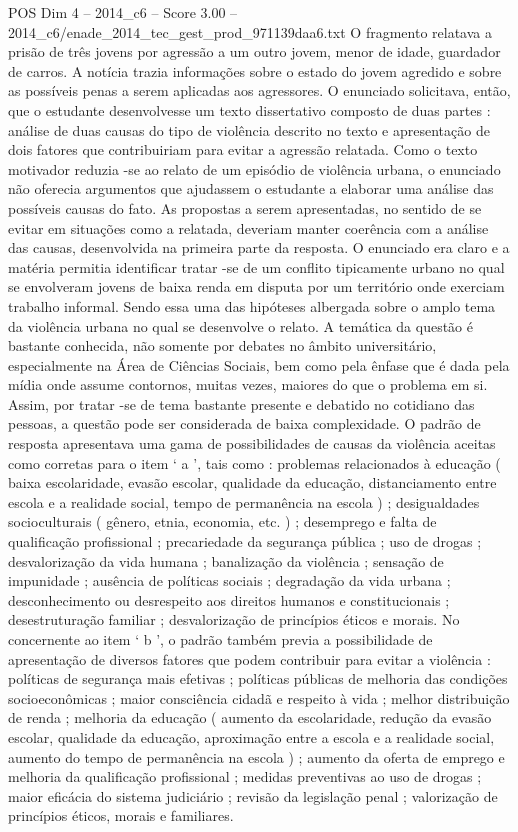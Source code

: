 \begin{textsample}{POS Dim 4 – 2014\_c6 – Score 3.00 – 2014\_c6/enade\_2014\_tec\_gest\_prod\_971139daa6.txt}
O fragmento relatava a prisão de três jovens por agressão a um outro jovem, menor de idade, guardador de carros.
A notícia trazia informações sobre o estado do jovem agredido e sobre as possíveis penas a serem aplicadas aos agressores.
O enunciado solicitava, então, que o estudante desenvolvesse um texto dissertativo composto de duas partes : análise de duas causas do tipo de violência descrito no texto e apresentação de dois fatores que contribuiriam para evitar a agressão relatada.
Como o texto motivador reduzia -se ao relato de um episódio de violência urbana, o enunciado não oferecia argumentos que ajudassem o estudante a elaborar uma análise das possíveis causas do fato.
As propostas a serem apresentadas, no sentido de se evitar em situações como a relatada, deveriam manter coerência com a análise das causas, desenvolvida na primeira parte da resposta.
O enunciado era claro e a matéria permitia identificar tratar -se de um conflito tipicamente urbano no qual se envolveram jovens de baixa renda em disputa por um território onde exerciam trabalho informal.
Sendo essa uma das hipóteses albergada sobre o amplo tema da violência urbana no qual se desenvolve o relato.
A temática da questão é bastante conhecida, não somente por debates no âmbito universitário, especialmente na Área de Ciências Sociais, bem como pela ênfase que é dada pela mídia onde assume contornos, muitas vezes, maiores do que o problema em si.
Assim, por tratar -se de tema bastante presente e debatido no cotidiano das pessoas, a questão pode ser considerada de baixa complexidade.
O padrão de resposta apresentava uma gama de possibilidades de causas da violência aceitas como corretas para o item ‘ a ’, tais como : problemas relacionados à educação ( baixa escolaridade, evasão escolar, qualidade da educação, distanciamento entre escola e a realidade social, tempo de permanência na escola ) ; desigualdades socioculturais ( gênero, etnia, economia, etc. ) ; desemprego e falta de qualificação profissional ; precariedade da segurança pública ; uso de drogas ; desvalorização da vida humana ; banalização da violência ; sensação de impunidade ; ausência de políticas sociais ; degradação da vida urbana ; desconhecimento ou desrespeito aos direitos humanos e constitucionais ; desestruturação familiar ; desvalorização de princípios éticos e morais.
No concernente ao item ‘ b ’, o padrão também previa a possibilidade de apresentação de diversos fatores que podem contribuir para evitar a violência : políticas de segurança mais efetivas ; políticas públicas de melhoria das condições socioeconômicas ; maior consciência cidadã e respeito à vida ; melhor distribuição de renda ; melhoria da educação ( aumento da escolaridade, redução da evasão escolar, qualidade da educação, aproximação entre a escola e a realidade social, aumento do tempo de permanência na escola ) ; aumento da oferta de emprego e melhoria da qualificação profissional ; medidas preventivas ao uso de drogas ; maior eficácia do sistema judiciário ; revisão da legislação penal ; valorização de princípios éticos, morais e familiares.

\end{textsample}

